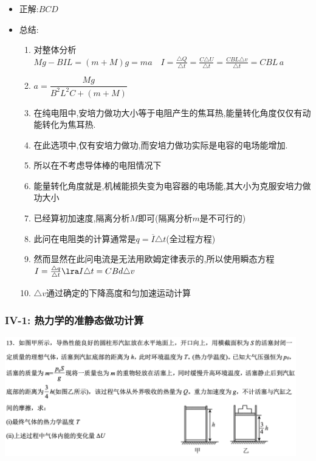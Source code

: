 \documentclass{article}
\begin{document}
\begin{itemize}
    \item 正解:\quad $BCD$
    \item 总结:\quad

          \hspace{2em}\begin{minipage}{0.88\textwidth}
              \begin{enumerate}[label = (\Alph*)]
                  \item 对整体分析$Mg - BIL = (m+M)g = ma \quad I = \frac{\triangle Q}{\triangle t}
                            = \frac{C \triangle U}{\triangle t} = \frac{C BL \triangle v}{\triangle t} = CBL \, a$

                  \item[] $a = \dfrac{Mg}{B^{2}L^{2}C + (m+M)} $
                  \item 在纯电阻中,安培力做功大小等于电阻产生的焦耳热,能量转化角度仅仅有动能转化为焦耳热.
                  \item[] 在此选项中,仅有安培力做功,而安培力做功实际是电容的电场能增加.
                  \item[] 所以在不考虑导体棒的电阻情况下
                  \item[] 能量转化角度就是,机械能损失变为电容器的电场能,其大小为克服安培力做功大小
                  \item 已经算初加速度,隔离分析$M$即可(隔离分析$m$是不可行的)
                  \item 此问在电阻类的计算通常是$q = \overline{I} \triangle t$(全过程方程)
                  \item[] 然而显然在此问电流是无法用欧姆定律表示的,所以使用瞬态方程
                      $I = \frac{\triangle q}{\triangle t} \lra I \triangle t = CBd \triangle v$
                  \item[] $\triangle v$通过确定的下降高度和匀加速运动计算
              \end{enumerate}
          \end{minipage}
\end{itemize}

\vspace{2em}

\subsubsection{IV-1: 热力学的准静态做功计算}
\includegraphics[width=0.95\textwidth,keepaspectratio]{./pictures/3.11-4.png}
\end{document}
